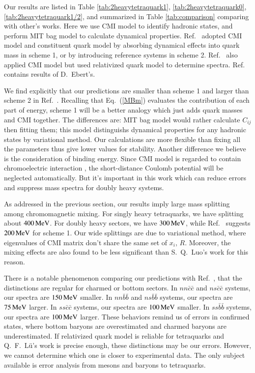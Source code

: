 \documentclass[prd,twocolumn,floatfix,nofootinbib]{revtex4}
\begin{document}
Our results are listed in Table \ref{tab:2heavytetraquark1}, \ref{tab:2heavytetraquark0}, \ref{tab:2heavytetraquark1/2}, and summarized in Table \ref{tab:comparison} comparing with other's works.
Here we use CMI model to identify hadronic states, and perform MIT bag model to calculate dynamical properties. 
Ref.~\cite{Luo:2017eub} adopted CMI model and constituent quark model by absorbing dynamical effects into quark mass in scheme 1, or by introducing reference systems in scheme 2.
Ref.~\cite{Lu:2020rog} also applied CMI model but used relativized quark model to determine spectra.
Ref.~\cite{Ebert:2007rn} contains results of D.~Ebert's.

We find explicitly that our predictions are smaller than scheme 1 and larger than scheme 2 in Ref.~\cite{Luo:2017eub}. 
Recalling that Eq.~(\ref{MBm}) evaluates the contribution of each part of energy, scheme 1 will be a better analogy which just adds quark masses and CMI together.
The differences are: MIT bag model would rather calculate $C_{ij}$ then fitting them; this model distinguishs dynamical properties for any hadronic states by variational method.
Our calculations are more flexible than fixing all the parameters thus give lower values for stability.
Another difference we believe is the consideration of binding energy. Since CMI model is regarded to contain chromoelectric interaction \cite{Liu:2019zoy}, the short-distance Coulomb potential will be neglected automatically.
But it's important in this work which can reduce errors and suppress mass spectra for doubly heavy systems.

As addressed in the previous section, our results imply large mass splitting among chromomagnetic mixing. For singly heavy tetraquarks, we have splitting about $400\,{\rm MeV}$.
For doubly heavy sectors, we have $300\,{\rm MeV}$, while Ref.~\cite{Luo:2017eub} suggests $200\,{\rm MeV}$ for scheme 1.
Our wide splittings are due to variational method, where eigenvalues of CMI matrix don't share the same set of $x_{i}$, $R$.
Moreover, the mixing effects are also found to be less significant than S.~Q.~Luo's work for this reason.

There is a notable phenomenon comparing our predictions with Ref.~\cite{Lu:2020rog}, that the distinctions are regular for charmed or bottom sectors.
In $nn\bar{c}\bar{c}$ and $ns\bar{c}\bar{c}$ systems, our spectra are $150\,{\rm MeV}$ smaller.
In $nn\bar{b}\bar{b}$ and $ns\bar{b}\bar{b}$ systems, our spectra are $75\,{\rm MeV}$ larger.
In $ss\bar{c}\bar{c}$ systems, our spectra are $100\,{\rm MeV}$ smaller.
In $ss\bar{b}\bar{b}$ systems, our spectra are $100\,{\rm MeV}$ larger.
These behaviors remind us of errors in confirmed states, where bottom baryons are overestimated and charmed baryons are underestimated.
If relativized quark model is reliable for tetraquarks and Q.~F.~L\"u's work is precise enough, these distinctions may be our errors.
However, we cannot determine which one is closer to experimental data. The only subject available is error analysis from mesons and baryons to tetraquarks.
\end{document}
